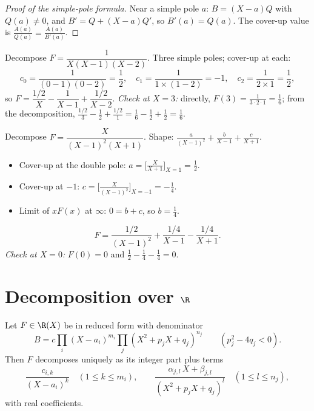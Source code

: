 \begin{proof}[Proof of the simple-pole formula]
Near a simple pole $a$: $B = (X - a) Q$ with $Q(a) \neq 0$, and $B' =
Q + (X - a) Q'$, so $B'(a) = Q(a)$. The cover-up value is
$\frac{A(a)}{Q(a)} = \frac{A(a)}{B'(a)}$.
\end{proof}

\begin{example}\label{ex:b1:fractions:simple}
Decompose $F = \dfrac{1}{X(X-1)(X-2)}$. Three simple poles; cover-up
at each:
\[
c_0 = \frac{1}{(0-1)(0-2)} = \frac12,
\quad
c_1 = \frac{1}{1 \times (1 - 2)} = -1,
\quad
c_2 = \frac{1}{2 \times 1} = \frac12,
\]
so $F = \dfrac{1/2}{X} - \dfrac{1}{X-1} + \dfrac{1/2}{X-2}$.
\emph{Check at $X = 3$:} directly, $F(3) = \frac{1}{3\cdot2\cdot1} =
\frac16$; from the decomposition, $\frac{1/2}{3} - \frac{1}{2} +
\frac{1/2}{1} = \frac16 - \frac12 + \frac12 = \frac16$.
\end{example}

\begin{example}\label{ex:b1:fractions:multiple}
Decompose $F = \dfrac{X}{(X-1)^2 (X+1)}$. Shape:
$\frac{a}{(X-1)^2} + \frac{b}{X-1} + \frac{c}{X+1}$.
\begin{itemize}
  \item Cover-up at the double pole: $a = \bigl[\frac{X}{X+1}\bigr]_{X=1}
        = \frac12$.
  \item Cover-up at $-1$: $c = \bigl[\frac{X}{(X-1)^2}\bigr]_{X=-1} =
        -\frac14$.
  \item Limit of $xF(x)$ at $\infty$: $0 = b + c$, so $b = \frac14$.
\end{itemize}
\[
F = \frac{1/2}{(X-1)^2} + \frac{1/4}{X-1} - \frac{1/4}{X+1} .
\]
\emph{Check at $X = 0$:} $F(0) = 0$ and $\frac12 - \frac14 - \frac14
= 0$.
\end{example}

\section{Decomposition over $\R$}

\begin{theorem}\label{thm:b1:fractions:real}
Let $F \in \R(X)$ be in reduced form with denominator
\[
B = c \prod_i (X - a_i)^{m_i} \prod_j (X^2 + p_j X + q_j)^{n_j}
\qquad (p_j^2 - 4q_j < 0).
\]
Then $F$ decomposes uniquely as its integer part plus terms
\[
\frac{c_{i,k}}{(X - a_i)^k} \quad (1 \leq k \leq m_i),
\qquad
\frac{\alpha_{j,l}\, X + \beta_{j,l}}{(X^2 + p_j X + q_j)^{l}}
\quad (1 \leq l \leq n_j),
\]
with real coefficients.
\end{theorem}

